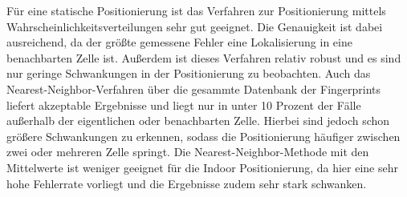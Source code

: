 Für eine statische Positionierung ist das Verfahren zur Positionierung mittels Wahrscheinlichkeitsverteilungen sehr gut geeignet. Die Genauigkeit ist dabei ausreichend, da der größte gemessene Fehler eine Lokalisierung in eine benachbarten Zelle ist. Außerdem ist dieses Verfahren relativ robust und es sind nur geringe Schwankungen in der Positionierung zu beobachten.
Auch das Nearest-Neighbor-Verfahren über die gesammte Datenbank der Fingerprints liefert akzeptable Ergebnisse und liegt nur in unter 10 Prozent der Fälle außerhalb der eigentlichen oder benachbarten Zelle. Hierbei sind jedoch schon größere Schwankungen zu erkennen, sodass die Positionierung häufiger zwischen zwei oder mehreren Zelle springt.
Die Nearest-Neighbor-Methode mit den Mittelwerte ist weniger geeignet für die Indoor Positionierung, da hier eine sehr hohe Fehlerrate vorliegt und die Ergebnisse zudem sehr stark schwanken.
